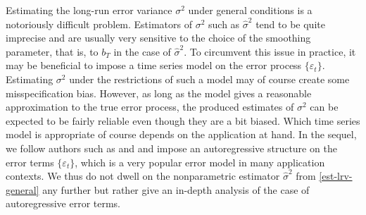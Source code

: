 Estimating the long-run error variance $\sigma^2$ under general conditions is a notoriously difficult problem. Estimators of $\sigma^2$ such as $\widehat{\sigma}^2$ tend to be quite imprecise and are usually very sensitive to the choice of the smoothing parameter, that is, to $b_T$ in the case of $\widehat{\sigma}^2$. To circumvent this issue in practice, it may be beneficial to impose a time series model on the error process $\{\varepsilon_t\}$. Estimating $\sigma^2$ under the restrictions of such a model may of course create some misspecification bias. However, as long as the model gives a reasonable approximation to the true error process, the produced estimates of $\sigma^2$ can be expected to be fairly reliable even though they are a bit biased. Which time series model is appropriate of course depends on the application at hand. In the sequel, we follow authors such as \cite{Hart1994} and \cite{Hall2003} and impose an autoregressive structure on the error terms $\{\varepsilon_t\}$, which is a very popular error model in many application contexts. We thus do not dwell on the nonparametric estimator $\widehat{\sigma}^2$ from \eqref{est-lrv-general} any further but rather give an in-depth analysis of the case of autoregressive error terms. 



